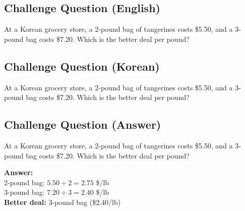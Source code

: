 \cleardoublepage
\subsection*{Challenge Question (English)}
At a Korean grocery store, a 2-pound bag of tangerines costs \$5.50, and a 3-pound bag costs \$7.20. Which is the better deal per pound?


\newpage
\subsection*{Challenge Question (Korean)}
At a Korean grocery store, a 2-pound bag of tangerines costs \$5.50, and a 3-pound bag costs \$7.20. Which is the better deal per pound?


\newpage
\subsection*{Challenge Question (Answer)}
At a Korean grocery store, a 2-pound bag of tangerines costs \$5.50, and a 3-pound bag costs \$7.20. Which is the better deal per pound?

\textbf{Answer:}\\
2-pound bag: $5.50 \div 2 = 2.75$ \$/lb\\
3-pound bag: $7.20 \div 3 = 2.40$ \$/lb\\
\textbf{Better deal:} 3-pound bag (\$2.40/lb)

